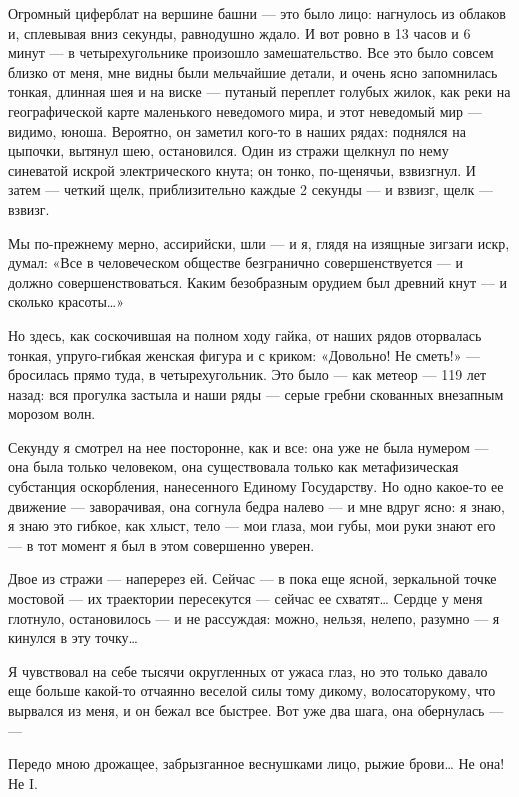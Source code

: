 \documentclass[11pt,openany]{book}
\begin{document}
Огромный циферблат на вершине башни --- это было лицо: нагнулось из облаков и, сплевывая вниз секунды, равнодушно ждало. И вот ровно в 13 часов и 6 минут --- в четырехугольнике произошло замешательство. Все это было совсем близко от меня, мне видны были мельчайшие детали, и очень ясно запомнилась тонкая, длинная шея и на виске --- путаный переплет голубых жилок, как реки на географической карте маленького неведомого мира, и этот неведомый мир --- видимо, юноша. Вероятно, он заметил кого-то в наших рядах: поднялся на цыпочки, вытянул шею, остановился. Один из стражи щелкнул по нему синеватой искрой электрического кнута; он тонко, по-щенячьи, взвизгнул. И затем --- четкий щелк, приблизительно каждые 2 секунды --- и взвизг, щелк --- взвизг.

Мы по-прежнему мерно, ассирийски, шли --- и я, глядя на изящные зигзаги искр, думал: «Все в человеческом обществе безгранично совершенствуется --- и должно совершенствоваться. Каким безобразным орудием был древний кнут --- и сколько красоты\ldots{}»

Но здесь, как соскочившая на полном ходу гайка, от наших рядов оторвалась тонкая, упруго-гибкая женская фигура и с криком: «Довольно! Не сметь!» --- бросилась прямо туда, в четырехугольник. Это было --- как метеор --- 119 лет назад: вся прогулка застыла и наши ряды --- серые гребни скованных внезапным морозом волн.

Секунду я смотрел на нее посторонне, как и все: она уже не была нумером --- она была только человеком, она существовала только как метафизическая субстанция оскорбления, нанесенного Единому Государству. Но одно какое-то ее движение --- заворачивая, она согнула бедра налево --- и мне вдруг ясно: я знаю, я знаю это гибкое, как хлыст, тело --- мои глаза, мои губы, мои руки знают его --- в тот момент я был в этом совершенно уверен.

Двое из стражи --- наперерез ей. Сейчас --- в пока еще ясной, зеркальной точке мостовой --- их траектории пересекутся --- сейчас ее схватят\ldots{} Сердце у меня глотнуло, остановилось --- и не рассуждая: можно, нельзя, нелепо, разумно --- я кинулся в эту точку\ldots{}

Я чувствовал на себе тысячи округленных от ужаса глаз, но это только давало еще больше какой-то отчаянно веселой силы тому дикому, волосаторукому, что вырвался из меня, и он бежал все быстрее. Вот уже два шага, она обернулась --- ---

Передо мною дрожащее, забрызганное веснушками лицо, рыжие брови\ldots{} Не она! Не I.
\end{document}
